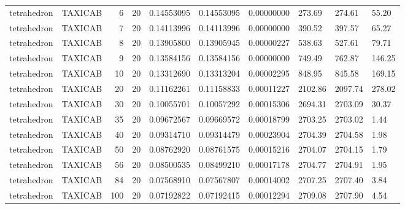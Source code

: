 \begin{longtable}{llrrllllll}
tetrahedron & TAXICAB & 6 & 20 & 0.14553095 & 0.14553095 & 0.00000000 & 273.69 & 274.61 & 55.20 \\
tetrahedron & TAXICAB & 7 & 20 & 0.14113996 & 0.14113996 & 0.00000000 & 390.52 & 397.57 & 65.27 \\
tetrahedron & TAXICAB & 8 & 20 & 0.13905800 & 0.13905945 & 0.00000227 & 538.63 & 527.61 & 79.71 \\
tetrahedron & TAXICAB & 9 & 20 & 0.13584156 & 0.13584156 & 0.00000000 & 749.49 & 762.87 & 146.25 \\
tetrahedron & TAXICAB & 10 & 20 & 0.13312690 & 0.13313204 & 0.00002295 & 848.95 & 845.58 & 169.15 \\
tetrahedron & TAXICAB & 20 & 20 & 0.11162261 & 0.11158833 & 0.00011227 & 2102.86 & 2097.74 & 278.02 \\
tetrahedron & TAXICAB & 30 & 20 & 0.10055701 & 0.10057292 & 0.00015306 & 2694.31 & 2703.09 & 30.37 \\
tetrahedron & TAXICAB & 35 & 20 & 0.09672567 & 0.09669572 & 0.00018799 & 2703.25 & 2703.02 & 1.44 \\
tetrahedron & TAXICAB & 40 & 20 & 0.09314710 & 0.09314479 & 0.00023904 & 2704.39 & 2704.58 & 1.98 \\
tetrahedron & TAXICAB & 50 & 20 & 0.08762920 & 0.08761575 & 0.00015216 & 2704.07 & 2704.15 & 1.79 \\
tetrahedron & TAXICAB & 56 & 20 & 0.08500535 & 0.08499210 & 0.00017178 & 2704.77 & 2704.91 & 1.95 \\
tetrahedron & TAXICAB & 84 & 20 & 0.07568910 & 0.07567807 & 0.00014002 & 2707.25 & 2707.40 & 3.84 \\
tetrahedron & TAXICAB & 100 & 20 & 0.07192822 & 0.07192415 & 0.00012294 & 2709.08 & 2707.90 & 4.54 \\
\end{longtable}
